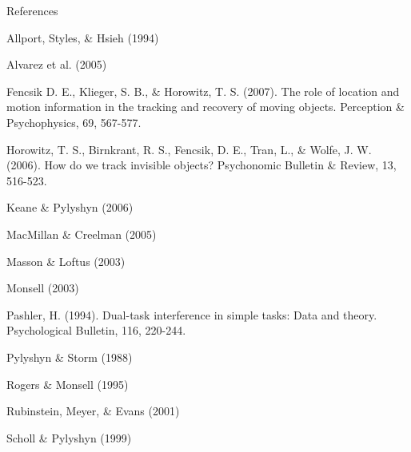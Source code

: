 References

Allport, Styles, & Hsieh (1994)

Alvarez et al. (2005)

Fencsik D. E., Klieger, S. B., & Horowitz, T. S. (2007). The role of
location and motion information in the tracking and recovery of moving
objects. Perception & Psychophysics, 69, 567-577.

Horowitz, T. S., Birnkrant, R. S., Fencsik, D. E., Tran, L., & Wolfe,
J. W. (2006). How do we track invisible objects? Psychonomic Bulletin &
Review, 13, 516-523.

Keane & Pylyshyn (2006)

MacMillan & Creelman (2005)

Masson & Loftus (2003)

Monsell (2003)

Pashler, H. (1994). Dual-task interference in simple tasks: Data and
theory. Psychological Bulletin, 116, 220-244.

Pylyshyn & Storm (1988)

Rogers & Monsell (1995)

Rubinstein, Meyer, & Evans (2001)

Scholl & Pylyshyn (1999)
